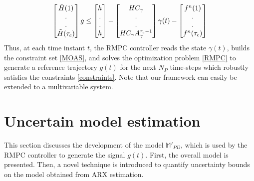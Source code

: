 \documentclass[letterpaper, 10 pt, conference]{ieeeconf}  %
\begin{document}
	 \begin{equation}
	 \begin{bmatrix}
	 \tilde{H}(1) \vspace{0.001cm} \\
	 . \vspace{0.001cm} \\
	 . \vspace{0.001cm} \\
	 \tilde{H}(\tau_c)
	 \end{bmatrix} g \leq
	 \begin{bmatrix}
	 h \vspace{0.001cm} \\
	 . \vspace{0.001cm} \\
	 . \vspace{0.001cm} \\
	 h
	 \end{bmatrix} - 
	 \begin{bmatrix}
	 HC_{\gamma} \vspace{0.001cm} \\
	 . \vspace{0.001cm} \\
	 . \vspace{0.001cm} \\
	 HC_{\gamma}A_{\gamma}^{\tau_c - 1}
	 \end{bmatrix}\gamma(t) - 
	 \begin{bmatrix}
	 f^n(1) \vspace{0.001cm} \\
	 . \vspace{0.001cm} \\
	 . \vspace{0.001cm} \\
	 f^n(\tau_c)
	 \end{bmatrix}
	 \label{MOAS}
	 \end{equation}
	 \normalsize
	 Thus, at each time instant $t$, the RMPC controller reads the state $\gamma(t)$, builds the constraint set \eqref{MOAS}, and solves the optimization problem \eqref{RMPC} to generate a reference trajectory $g(t)$ for the next $N_P$ time-steps which robustly satisfies the constraints \eqref{constraints}. Note that our framework can easily be extended to a multivariable system.
	 
	\section{Uncertain model estimation}
	\label{Contribution}
	This section discusses the development of the model $\mathbb{M}'_{PD}$, which is used by the RMPC controller to generate the signal $g(t)$. First, the overall model is presented. Then, a novel technique is introduced to quantify uncertainty bounds on the model obtained from ARX estimation.
\end{document}
